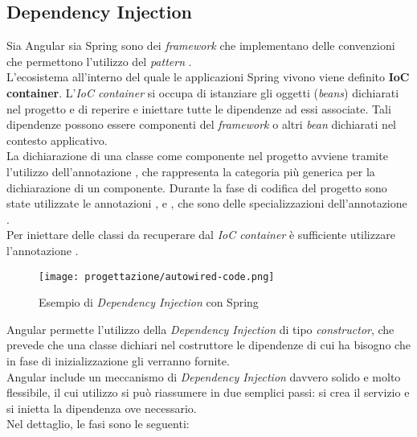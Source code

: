 \subsection{Dependency Injection}
\label{sub:Dependency-Injection}
Sia Angular sia Spring sono dei \textit{framework} che implementano delle convenzioni che permettono l'utilizzo del \textit{pattern} .\\
L'ecosistema all'interno del quale le applicazioni Spring vivono viene definito \textbf{IoC container}. L'\textit{IoC container} si occupa di istanziare gli oggetti (\textit{beans}) dichiarati nel progetto e di reperire e iniettare tutte le dipendenze ad essi associate. Tali dipendenze possono essere componenti del \textit{framework} o altri \textit{bean} dichiarati nel contesto applicativo.\\
La dichiarazione di una classe come componente nel progetto avviene tramite l'utilizzo dell'annotazione , che rappresenta la categoria più generica per la dichiarazione di un componente.
Durante la fase di codifica del progetto sono state utilizzate le annotazioni ,  e , che sono delle specializzazioni dell'annotazione .\\
Per iniettare delle classi da recuperare dal \textit{IoC container} è sufficiente utilizzare l'annotazione .
\begin{figure}[H] 
    \centering 
    \texttt{[image: progettazione/autowired-code.png]}
    \caption{Esempio di \textit{Dependency Injection} con Spring}
\end{figure}
\noindent Angular permette l'utilizzo della \textit{Dependency Injection} di tipo \textit{constructor}, che prevede che una classe dichiari nel costruttore le dipendenze di cui ha bisogno che in fase di inizializzazione gli verranno fornite.\\
Angular include un meccanismo di \textit{Dependency Injection} davvero solido e molto flessibile, il cui utilizzo si può riassumere in due semplici passi: si crea il servizio e si inietta la dipendenza ove necessario.\\
Nel dettaglio, le fasi sono le seguenti: 
